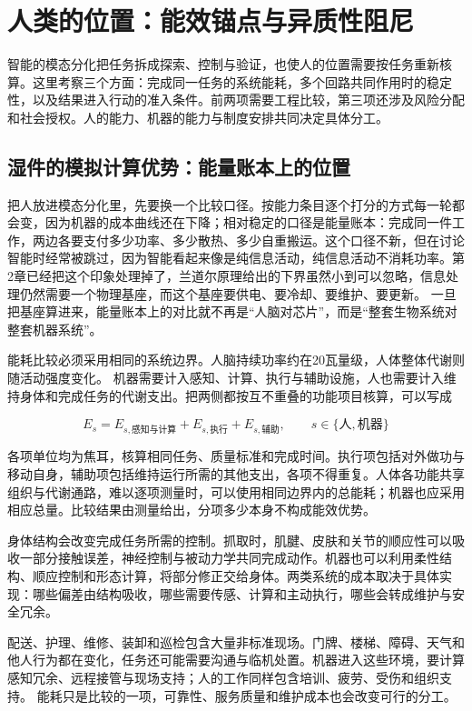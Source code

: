 \section{人类的位置：能效锚点与异质性阻尼}

智能的模态分化把任务拆成探索、控制与验证，也使人的位置需要按任务重新核算。这里考察三个方面：完成同一任务的系统能耗，多个回路共同作用时的稳定性，以及结果进入行动的准入条件。前两项需要工程比较，第三项还涉及风险分配和社会授权。人的能力、机器的能力与制度安排共同决定具体分工。

\subsection{湿件的模拟计算优势：能量账本上的位置}

把人放进模态分化里，先要换一个比较口径。按能力条目逐个打分的方式每一轮都会变，因为机器的成本曲线还在下降；相对稳定的口径是能量账本：完成同一件工作，两边各要支付多少功率、多少散热、多少自重搬运。这个口径不新，但在讨论智能时经常被跳过，因为智能看起来像是纯信息活动，纯信息活动不消耗功率。第2章已经把这个印象处理掉了，兰道尔原理给出的下界虽然小到可以忽略，信息处理仍然需要一个物理基座，而这个基座要供电、要冷却、要维护、要更新。\cite{landauer1961} 一旦把基座算进来，能量账本上的对比就不再是“人脑对芯片”，而是“整套生物系统对整套机器系统”。

能耗比较必须采用相同的系统边界。人脑持续功率约在20瓦量级，人体整体代谢则随活动强度变化。\cite{smil2015power} 机器需要计入感知、计算、执行与辅助设施，人也需要计入维持身体和完成任务的代谢支出。把两侧都按互不重叠的功能项目核算，可以写成

\begin{equation}
E_s=E_{s,\text{感知与计算}}+E_{s,\text{执行}}+E_{s,\text{辅助}},\qquad s\in\{\text{人},\text{机器}\}
\end{equation}

各项单位均为焦耳，核算相同任务、质量标准和完成时间。执行项包括对外做功与移动自身，辅助项包括维持运行所需的其他支出，各项不得重复。人体各功能共享组织与代谢通路，难以逐项测量时，可以使用相同边界内的总能耗；机器也应采用相应总量。比较结果由测量给出，分项多少本身不构成能效优势。

身体结构会改变完成任务所需的控制。抓取时，肌腱、皮肤和关节的顺应性可以吸收一部分接触误差，神经控制与被动力学共同完成动作。机器也可以利用柔性结构、顺应控制和形态计算，将部分修正交给身体。两类系统的成本取决于具体实现：哪些偏差由结构吸收，哪些需要传感、计算和主动执行，哪些会转成维护与安全冗余。

配送、护理、维修、装卸和巡检包含大量非标准现场。门牌、楼梯、障碍、天气和他人行为都在变化，任务还可能需要沟通与临机处置。机器进入这些环境，要计算感知冗余、远程接管与现场支持；人的工作同样包含培训、疲劳、受伤和组织支持。\cite{moravec1988,pfeiferbongard2006} 能耗只是比较的一项，可靠性、服务质量和维护成本也会改变可行的分工。

